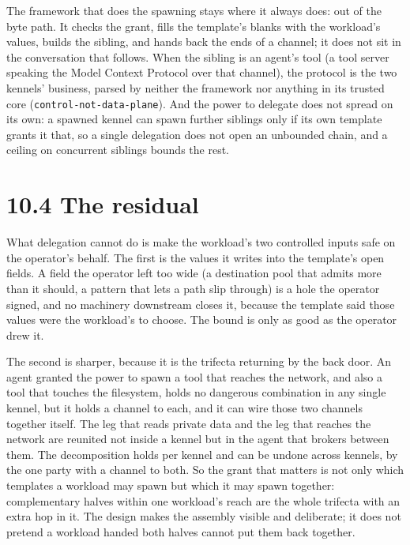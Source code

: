 The framework that does the spawning stays where it always does: out of
the byte path. It checks the grant, fills the template's blanks with the
workload's values, builds the sibling, and hands back the ends of a
channel; it does not sit in the conversation that follows. When the
sibling is an agent's tool (a tool server speaking the Model Context
Protocol over that channel), the protocol is the two kennels' business,
parsed by neither the framework nor anything in its trusted core
(\texttt{control-not-data-plane}). And the power to delegate does not
spread on its own: a spawned kennel can spawn further siblings only if
its own template grants it that, so a single delegation does not open an
unbounded chain, and a ceiling on concurrent siblings bounds the rest.

\hypertarget{the-residual}{%
\section{10.4 The residual}\label{the-residual}}

What delegation cannot do is make the workload's two controlled inputs
safe on the operator's behalf. The first is the values it writes into
the template's open fields. A field the operator left too wide (a
destination pool that admits more than it should, a pattern that lets a
path slip through) is a hole the operator signed, and no machinery
downstream closes it, because the template said those values were the
workload's to choose. The bound is only as good as the operator drew it.

The second is sharper, because it is the trifecta returning by the back
door. An agent granted the power to spawn a tool that reaches the
network, and also a tool that touches the filesystem, holds no dangerous
combination in any single kennel, but it holds a channel to each, and it
can wire those two channels together itself. The leg that reads private
data and the leg that reaches the network are reunited not inside a
kennel but in the agent that brokers between them. The decomposition
holds per kennel and can be undone across kennels, by the one party with
a channel to both. So the grant that matters is not only which templates
a workload may spawn but which it may spawn together: complementary
halves within one workload's reach are the whole trifecta with an extra
hop in it. The design makes the assembly visible and deliberate; it does
not pretend a workload handed both halves cannot put them back together.


